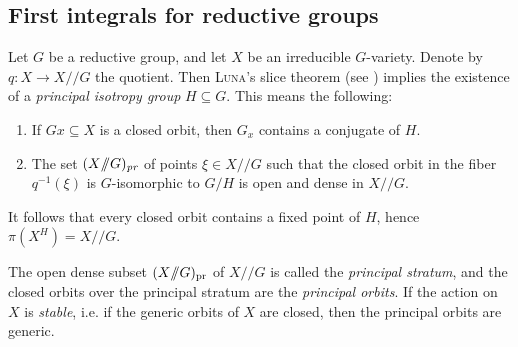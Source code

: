 \documentclass{amsart}
\theoremstyle{definition}
\theoremstyle{remark}
\begin{document}
{\par\smallskip}
\subsection{First integrals for reductive groups}
Let $G$ be a reductive group, and let $X$ be an irreducible $G$-variety. Denote by $q\colon X \to X{/\!\!/} G$ the quotient. Then {\textsc{{Luna}\/}}'s slice theorem (see \cite[pp.~97--98]{Lu1973Slices-etales}) implies the existence of a {\it principal isotropy group\/} $H {\subseteq} G$. This means the following:
\begin{enumerate}
\item If $Gx {\subseteq} X$ is a closed orbit, then $G_{x}$ contains a conjugate of $H$.
\item The set $(X{/\!\!/} G)_{\text{\it pr}}$ of points $\xi\in X{/\!\!/} G$ such that the closed orbit in the fiber $q^{-1}(\xi)$ is $G$-isomorphic to $G/H$ is open and dense in $X{/\!\!/} G$. 
\end{enumerate}
It follows that every closed orbit contains a fixed point of $H$, hence $\pi(X^{H}) = X {/\!\!/} G$. 
\par\smallskip
The open dense subset $(X{/\!\!/} G)_{\text{\rm pr}}$ of $X{/\!\!/} G$ is called the {\it principal stratum}, and the closed orbits over the principal stratum are the {\it principal orbits}. If the action on $X$ is {\it stable}, i.e. if the generic orbits of $X$ are closed, then the principal orbits are generic.
\end{document}
